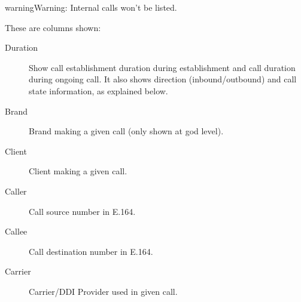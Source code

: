 \documentclass[letterpaper,10pt,english]{sphinxmanual}
\begin{document}
\begin{notice}{warning}{Warning:}
Internal calls won't be listed.
\end{notice}

These are columns shown:
\begin{description}
\item[{Duration}] \leavevmode{}\label{administration_portal/brand/calls/active_calls:term-duration}
Show call establishment duration during establishment and call duration during ongoing call. It also shows
direction (inbound/outbound) and call state information, as explained below.

\item[{Brand}] \leavevmode{}\label{administration_portal/brand/calls/active_calls:term-brand}
Brand making a given call (only shown at god level).

\item[{Client}] \leavevmode{}\label{administration_portal/brand/calls/active_calls:term-client}
Client making a given call.

\item[{Caller}] \leavevmode{}\label{administration_portal/brand/calls/active_calls:term-caller}
Call source number in E.164.

\item[{Callee}] \leavevmode{}\label{administration_portal/brand/calls/active_calls:term-callee}
Call destination number in E.164.

\item[{Carrier}] \leavevmode{}\label{administration_portal/brand/calls/active_calls:term-carrier}
Carrier/DDI Provider used in given call.

\end{description}
\end{document}
